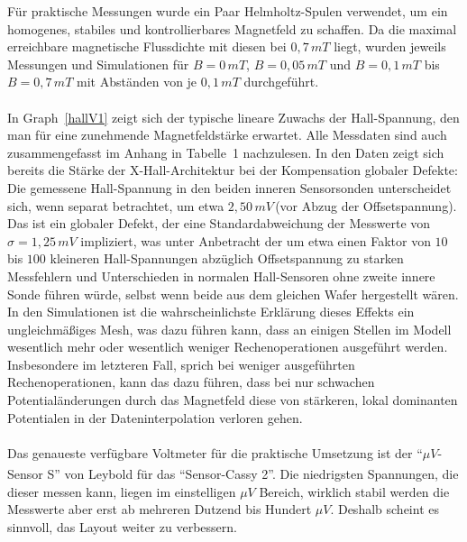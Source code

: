\documentclass[12pt, a4paper]{article}
\begin{document}
Für praktische Messungen wurde ein Paar Helmholtz-Spulen verwendet, um ein homogenes, stabiles und kontrollierbares Magnetfeld zu schaffen. Da die maximal erreichbare magnetische Flussdichte mit diesen bei $0,7\,mT$ liegt, wurden jeweils Messungen und Simulationen für $B=0\,mT$, $B=0,05\,mT$ und $B=0,1\,mT$ bis $B=0,7\,mT$ mit Abständen von je $0,1\,mT$ durchgeführt.
\paragraph{}

In Graph~\ref*{hallV1} zeigt sich der typische lineare Zuwachs der Hall-Spannung, den man für eine zunehmende Magnetfeldstärke erwartet.\newline 
Alle Messdaten sind auch zusammengefasst im Anhang in Tabelle~1 nachzulesen.\newline
In den Daten zeigt sich bereits die Stärke der X-Hall-Architektur bei der Kompensation globaler Defekte: Die gemessene Hall-Spannung in den beiden inneren Sensorsonden unterscheidet sich, wenn separat betrachtet, um etwa $2,50\,mV$\,(vor Abzug der Offsetspannung). Das ist ein globaler Defekt, der eine Standardabweichung der Messwerte von $\sigma=1,25\,mV$ impliziert, was unter Anbetracht der um etwa einen Faktor von $10$ bis $100$ kleineren Hall-Spannungen abzüglich Offsetspannung zu starken Messfehlern und Unterschieden in normalen Hall-Sensoren ohne zweite innere Sonde führen würde, selbst wenn beide aus dem gleichen Wafer hergestellt wären.\newline
In den Simulationen ist die wahrscheinlichste Erklärung dieses Effekts ein ungleichmäßiges Mesh, was dazu führen kann, dass an einigen Stellen im Modell wesentlich mehr oder wesentlich weniger Rechenoperationen ausgeführt werden. Insbesondere im letzteren Fall, sprich bei weniger ausgeführten Rechenoperationen, kann das dazu führen, dass bei nur schwachen Potentialänderungen durch das Magnetfeld diese von stärkeren, lokal dominanten Potentialen in der Dateninterpolation verloren gehen.\paragraph{} 
Das genaueste verfügbare Voltmeter für die praktische Umsetzung ist der ``$\mu{V}$-Sensor S'' von Leybold\textsuperscript{\textregistered} für das ``Sensor-Cassy 2''. Die niedrigsten Spannungen, die dieser messen kann, liegen im einstelligen $\mu{V}$ Bereich, wirklich stabil werden die Messwerte aber erst ab mehreren Dutzend bis Hundert $\mu{V}$.\newline
Deshalb scheint es sinnvoll, das Layout weiter zu verbessern.
\end{document}
